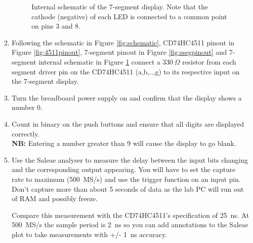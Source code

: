 \documentclass{UoNMCHA}
\numberwithin{equation}{section}
\begin{document}
\begin{enumerate}
\begin{figure}[H]
\caption{Internal schematic of the 7-segment display. Note that the cathode (negative) of each LED is connected to a common point on pins 3 and 8.}
\label{fig:sseginternal}
\end{figure}
    \item Following the schematic in Figure \ref{fig:schematic}, CD74HC4511 pinout in Figure \ref{fig:4511pinout}, 7-segment pinout in Figure \ref{fig:ssegpinout} and 7-segment internal schematic in Figure \ref{fig:sseginternal} connect a $330~\Omega$ resistor from each segment driver pin on the CD74HC4511 (a,b,..,g) to its respective input on the 7-segment display.
    \item Turn the breadboard power supply on and confirm that the display shows a number 0.
    \item Count in binary on the push buttons and ensure that all digits are displayed correctly. \\\textbf{NB:} Entering a number greater than 9 will cause the display to go blank.
    \item Use the Saleae analyser to measure the delay between the input bits changing and the corresponding output appearing. You will have to set the capture rate to maximum (500~MS/s) and use the trigger function on an input pin. Don't capture more than about 5 seconds of data as the lab PC will run out of RAM and possibly freeze.
    
    Compare this measurement with the CD74HC4511's specification of 25~ns. At 500~MS/s the sample period is 2~ns so you can add annotations to the Saleae plot to take measurements with +/- 1~ns accuracy.
\end{enumerate}
\end{document}
